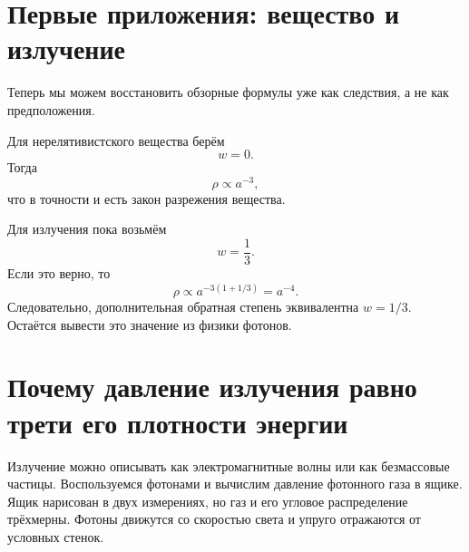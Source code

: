 \section{Первые приложения: вещество и излучение}

Теперь мы можем восстановить обзорные формулы уже как следствия, а не как предположения.

Для нерелятивистского вещества берём
\begin{equation}
w=0.
\end{equation}
Тогда
\begin{equation}
\rho\propto a^{-3},
\end{equation}
что в точности и есть закон разрежения вещества.

Для излучения пока возьмём
\begin{equation}
w=\frac13.
\end{equation}
Если это верно, то
\begin{equation}
\rho\propto a^{-3(1+1/3)}=a^{-4}.
\end{equation}
Следовательно, дополнительная обратная степень эквивалентна \(w=1/3\). Остаётся вывести это значение из физики фотонов.

\section{Почему давление излучения равно трети его плотности энергии}

Излучение можно описывать как электромагнитные волны или как безмассовые частицы. Воспользуемся фотонами и вычислим давление фотонного газа в ящике. Ящик нарисован в двух измерениях, но газ и его угловое распределение трёхмерны. Фотоны движутся со скоростью света и упруго отражаются от условных стенок.

